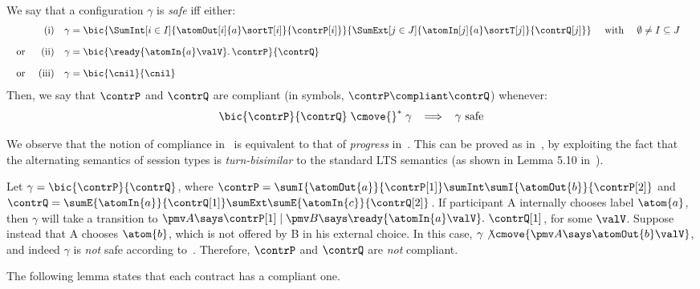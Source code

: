 \begin{definition}[Compliance] 
  \label{def:compliance}
  We say that a configuration $\gamma$ is \emph{safe} iff
  either:
  \[
  \begin{array}{lrllclr}
    &\text{(i)}&%
    \gamma = 
    \bic
    {\SumInt[i \in I]{\atomOut[i]{a}\sortT[i]}{\contrP[i]}}
    {\SumExt[j \in J]{\atomIn[j]{a}\sortT[j]}{\contrQ[j]}}
    & \text{ with } &
    \emptyset \neq I \subseteq J
    \\[10pt]
    \text{ or }%
    &\text{(ii)}&%
    \gamma = \bic{\ready{\atomIn{a}\valV}.\, \contrP}{\contrQ} & & & 
    \\[10pt]
    \text{ or } %
    &\text{(iii)}&%
    \gamma = \bic{\cnil}{\cnil} & & & 
  \end{array}
  \]
  Then, we say that $\contrP$ and $\contrQ$ are compliant 
  (in symbols, $\contrP \compliant \contrQ$)
  whenever:
  \[
  \bic{\contrP}{\contrQ}
  \;\cmove{}^*\;
  \gamma
  \;\;\implies\;\;
  \gamma \text{ safe}
  \]
\end{definition}

We observe that the notion of compliance in~
is equivalent to that of \emph{progress} in~\cite{Barbanera10ppdp,BartolettiSZ14Concur}.
This can be proved as in~\cite{BCPZ15jlamp},
by exploiting the fact that the alternating semantics of session types is 
\emph{turn-bisimilar} to the standard LTS semantics
(as shown in Lemma 5.10 in~\cite{BCPZ15jlamp}).  %

\begin{example} \label{ex:contracts:1}
Let $\gamma = \bic{\contrP}{\contrQ}$, 
where $\contrP = \sumI{\atomOut{a}}{\contrP[1]} \sumInt \sumI{\atomOut{b}}{\contrP[2]}$ 
and $\contrQ = \sumE{\atomIn{a}}{\contrQ[1]} \sumExt \sumE{\atomIn{c}}{\contrQ[2]}$.
If participant {\pmv A} internally chooses label $\atom{a}$, 
then $\gamma$ will take a transition to 
\(
  {\pmv A} \says \contrP[1] \mid {\pmv B} \says \ready{\atomIn{a}\valV}.\ \contrQ[1]
\),
for some $\valV$.
Suppose instead that {\pmv A} chooses $\atom{b}$, 
which is not offered by {\pmv B} in his external choice.
In this case, $\gamma \not\cmove{\pmv A \says \atomOut{b}\valV}$,
and indeed $\gamma$ is \emph{not} safe according to~.
Therefore, $\contrP$ and $\contrQ$ are \emph{not} compliant.
\end{example}


The following lemma states that each contract has a compliant one.

